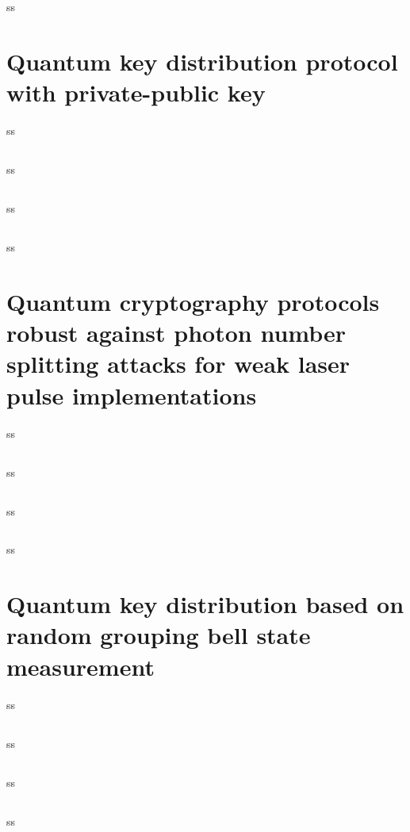 \subsection*{\dic}
ss
\section{Quantum key distribution protocol with private-public key}
ss
\subsection*{\trnas}
ss
\subsection*{\review}
ss
\subsection*{\dic}
ss
\section{Quantum cryptography protocols robust against photon number splitting attacks for weak laser pulse implementations}
ss
\subsection*{\trnas}
ss
\subsection*{\review}
ss
\subsection*{\dic}
ss
\section{Quantum key distribution based on random grouping bell state measurement}
ss
\subsection*{\trnas}
ss
\subsection*{\review}
ss
\subsection*{\dic}
ss
